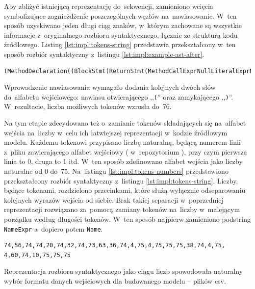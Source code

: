 \documentclass[twoside]{praca}
\begin{document}
Aby zbliżyć istniejącą reprezentację do~sekwencji, zamieniono wcięcia symbolizujące zagnieżdżenie poszczególnych węzłów na~nawiasowanie. W~ten sposób uzyskiwano jeden długi ciąg znaków, w~którym zachowane są wszystkie informacje z~oryginalnego rozbioru syntaktycznego, łącznie ze strukturą kodu źródłowego. Listing \ref{lst:impl:tokens-string} przedstawia przekształcony w~ten sposób rozbiór syntaktyczny z~listingu \ref{lst:impl:example-ast-after}.

\begin{lstlisting}[frame=single,caption={Reprezentacja rozbioru syntaktycznego metody w~postaci ciągu znaków},captionpos=b,label={lst:impl:tokens-string}]
(MethodDeclaration((BlockStmt(ReturnStmt(MethodCallExprNullLiteralExprNameExpr(SimpleName)SimpleName)))ClassOrInterfaceType(SimpleName)SimpleNameMarkerAnnotationExpr(Name)))
\end{lstlisting}

Wprowadzenie nawiasowania wymagało dodania kolejnych dwóch słów do~alfabetu wejściowego: nawiasu otwierającego ,,\texttt{(}'' oraz zamykającego ,,\texttt{)}''. W~rezultacie, liczba możliwych tokenów wzrosła do~76.

Na tym etapie zdecydowano też o~zamianie tokenów składających się na~alfabet wejścia na~liczby w~celu ich łatwiejszej reprezentacji w~kodzie źródłowym modelu. Każdemu tokenowi przypisano liczbę naturalną, będącą numerem linii z~pliku zawierającego alfabet wejściowy ( w~repozytorium \cite{fracz:refactor-extractor}), przy czym pierwsza linia to 0, druga to 1 itd. W~ten sposób zdefinowano alfabet wejścia jako liczby naturalne od 0 do~75. Na~listingu \ref{lst:impl:tokens-numbers} przedstawiono przekształcony rozbiór syntaktyczny z~listingu \ref{lst:impl:tokens-string}. Liczby, będące tokenami, rozdzielono przecinkami, które służą wyłącznie odseparowaniu kolejnych wyrazów wejścia od siebie. Brak takiej separacji w~poprzedniej reprezentacji rozwiązano za~pomocą zamiany tokenów na~liczby w~malejącym porządku według długości tokenów. W~ten sposób najpierw zamieniono podstring \texttt{NameExpr} a~dopiero potem \texttt{Name}.

\begin{lstlisting}[frame=single,caption={Reprezentacja rozbioru syntaktycznego metody w~postaci sekwencji liczb},captionpos=b,label={lst:impl:tokens-numbers}]
74,56,74,74,20,74,32,74,73,63,36,74,4,75,4,75,75,75,38,74,4,75, 4,60,74,10,75,75,75
\end{lstlisting}

Reprezentacja rozbioru syntaktycznego jako ciągu liczb spowodowała naturalny wybór formatu danych wejściowych dla budowanego modelu -- plików \gls{csv}.
\end{document}

